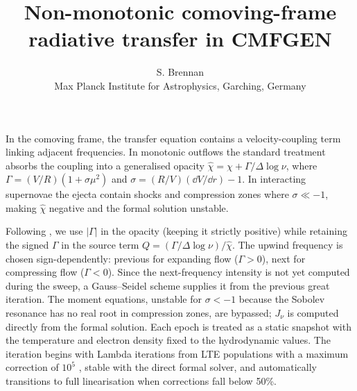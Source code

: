 \documentclass[a4paper, 10pt, twocolumn]{article}
\begin{document}
\title{Non-monotonic comoving-frame radiative transfer in CMFGEN}

\author{S. Brennan\\
\small Max Planck Institute for Astrophysics, Garching, Germany}
\date{}

\maketitle

In the comoving frame, the transfer equation contains a
velocity-coupling term linking adjacent frequencies.  In monotonic
outflows the standard treatment \citep{Hillier1998} absorbs the
coupling into a generalised opacity
$\hat\chi = \chi + \Gamma/\Delta\log\nu$, where
$\Gamma = (V/R)(1+\sigma\mu^2)$ and
$\sigma = (R/V)(\dd V/\dd r) - 1$.  In interacting supernovae the
ejecta contain shocks and compression zones where $\sigma \ll -1$,
making $\hat\chi$ negative and the formal solution unstable.

Following \citet{Knop2009}, we use $|\Gamma|$ in the opacity (keeping
it strictly positive) while retaining the signed $\Gamma$ in the
source term $Q = (\Gamma/\Delta\log\nu)/\hat\chi$.  The upwind
frequency is chosen sign-dependently: previous for expanding flow
($\Gamma > 0$), next for compressing flow ($\Gamma < 0$).  Since the
next-frequency intensity is not yet computed during the sweep, a
Gauss--Seidel scheme supplies it from the previous great iteration.
The moment equations, unstable for $\sigma < -1$ because the Sobolev
resonance has no real root in compression zones, are bypassed;
$J_\nu$ is computed directly from the formal solution.  Each epoch is
treated as a static snapshot with the temperature and electron density
fixed to the hydrodynamic values.  The iteration begins with Lambda
iterations from LTE populations with a maximum correction of $10^5$
\citep{HillierDessart2012}, stable with the direct formal solver, and
automatically transitions to full linearisation when corrections fall
below 50\%.



\end{document}
